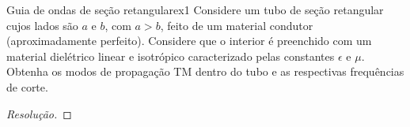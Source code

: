 \begin{exercício}{Guia de ondas de seção retangular}{ex1}
    Considere um tubo de seção retangular cujos lados são \(a\) e \(b\), com \(a > b\), feito de um material condutor (aproximadamente perfeito). Considere que o interior é preenchido com um material dielétrico linear e isotrópico caracterizado pelas constantes \(\epsilon\) e \(\mu\). Obtenha os modos de propagação TM dentro do tubo e as respectivas frequências de corte.
\end{exercício}
\begin{proof}[Resolução]
    
\end{proof}
